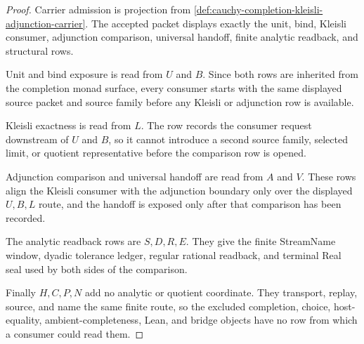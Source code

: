 \begin{proof}
Carrier admission is projection from \autoref{def:cauchy-completion-kleisli-adjunction-carrier}. The accepted packet displays exactly the unit, bind, Kleisli consumer, adjunction comparison, universal handoff, finite analytic readback, and structural rows.

Unit and bind exposure is read from $U$ and $B$. Since both rows are inherited from the completion monad surface, every consumer starts with the same displayed source packet and source family before any Kleisli or adjunction row is available.

Kleisli exactness is read from $L$. The row records the consumer request downstream of $U$ and $B$, so it cannot introduce a second source family, selected limit, or quotient representative before the comparison row is opened.

Adjunction comparison and universal handoff are read from $A$ and $V$. These rows align the Kleisli consumer with the adjunction boundary only over the displayed $U,B,L$ route, and the handoff is exposed only after that comparison has been recorded.

The analytic readback rows are $S,D,R,E$. They give the finite StreamName window, dyadic tolerance ledger, regular rational readback, and terminal Real seal used by both sides of the comparison.

Finally $H,C,P,N$ add no analytic or quotient coordinate. They transport, replay, source, and name the same finite route, so the excluded completion, choice, host-equality, ambient-completeness, Lean, and bridge objects have no row from which a consumer could read them.
\end{proof}

